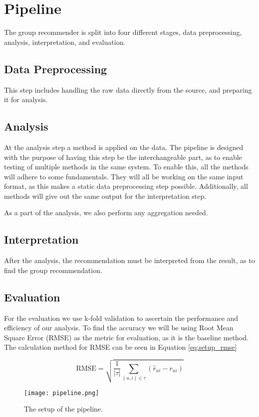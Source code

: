 \section{Pipeline}	\label{st:pipeline}
The group recommender is split into four different stages, data preprocessing, analysis, interpretation, and evaluation.

\subsection{Data Preprocessing}
This step includes handling the raw data directly from the source, and preparing it for analysis.
\subsection{Analysis}
At the analysis step a method is applied on the data. The pipeline is designed with the purpose of having this step be the interchangeable part, as to enable testing of multiple methods in the same system. To enable this, all the methods will adhere to some fundamentals. They will all be working on the same input format, as this makes a static data preprocessing step possible. Additionally, all methods will give out the same output for the interpretation step.

As a part of the analysis, we also perform any aggregation needed.
\subsection{Interpretation}
After the analysis, the recommendation must be interpreted from the result, as to find the group recommendation.
\subsection{Evaluation}
For the evaluation we use k-fold validation to ascertain the performance and efficiency of our analysis.
To find the accuracy we will be using Root Mean Square Error (RMSE) as the metric for evaluation, as it is the baseline method. The calculation method for RMSE can be seen in Equation \ref{eq:setup_rmse}

\begin{equation} \label{eq:setup_rmse}
	\text{RMSE} = \sqrt{\frac{1}{|\tau|}\sum_{(u,i)\in \tau}(\hat{r}_{ui}-r_{ui})}
\end{equation}


\begin{figure}
	\centering
	\texttt{[image: pipeline.png]}
	\caption{The setup of the pipeline. \label{fig:setup_pipeline}}
\end{figure}